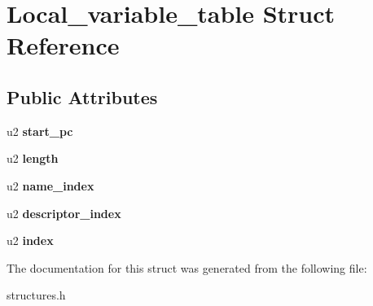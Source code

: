 \hypertarget{structLocal__variable__table}{}\section{Local\+\_\+variable\+\_\+table Struct Reference}
\label{structLocal__variable__table}
\subsection*{Public Attributes}
\begin{DoxyCompactItemize}
\item 
u2 {\bfseries start\+\_\+pc}\hypertarget{structLocal__variable__table_a857ab3f5a0d3a22f1eb7eccdd9c034e1}{}\label{structLocal__variable__table_a857ab3f5a0d3a22f1eb7eccdd9c034e1}

\item 
u2 {\bfseries length}\hypertarget{structLocal__variable__table_aa7ed2c337f001f6922abef82a7a2877b}{}\label{structLocal__variable__table_aa7ed2c337f001f6922abef82a7a2877b}

\item 
u2 {\bfseries name\+\_\+index}\hypertarget{structLocal__variable__table_ae14ab32d3cf126ede896ea6b1a7053a2}{}\label{structLocal__variable__table_ae14ab32d3cf126ede896ea6b1a7053a2}

\item 
u2 {\bfseries descriptor\+\_\+index}\hypertarget{structLocal__variable__table_ac30f0857c677e82b9665b709369adb5c}{}\label{structLocal__variable__table_ac30f0857c677e82b9665b709369adb5c}

\item 
u2 {\bfseries index}\hypertarget{structLocal__variable__table_aa9c60b3758f3edc8c4761af238e576a9}{}\label{structLocal__variable__table_aa9c60b3758f3edc8c4761af238e576a9}

\end{DoxyCompactItemize}


The documentation for this struct was generated from the following file\+:\begin{DoxyCompactItemize}
\item 
structures.\+h\end{DoxyCompactItemize}
